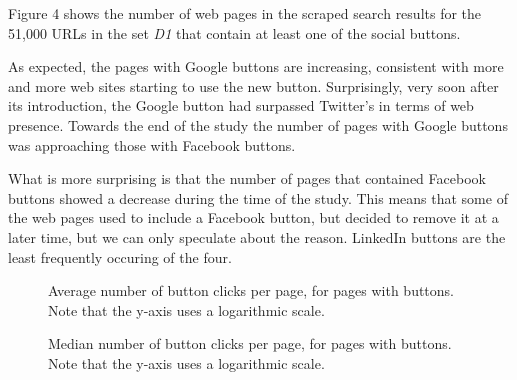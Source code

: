 \documentclass{sig-alternate}
\begin{document}
Figure 4 shows the number of web pages in the scraped search results for the 51,000 URLs in the set \emph{D1} that contain at least one of the social buttons.

As expected, the pages with Google buttons are increasing, consistent with more and more web sites starting to use the new button. Surprisingly, very soon after its introduction, the Google button had surpassed Twitter's in terms of web presence. Towards the end of the study the number of pages with Google buttons was approaching those with Facebook buttons. 

What is more surprising is that the number of pages that contained Facebook buttons showed a decrease during the time of the study. This means that some of the web pages used to include a Facebook button, but decided to remove it at a later time, but we can only speculate about the reason.
LinkedIn buttons are the least frequently occuring of the four. 

\begin{figure}[h]
\centering
{}
 \caption{Average number of button clicks per page, for pages with buttons. Note that the y-axis uses a logarithmic scale.}
\label{fig:average_clicks}
\end{figure}

\begin{figure}[h]
\centering
{}
 \caption{Median number of button clicks per page, for pages with buttons. Note that the y-axis uses a logarithmic scale.}
\label{fig:median_clicks}
\end{figure}
\end{document}
